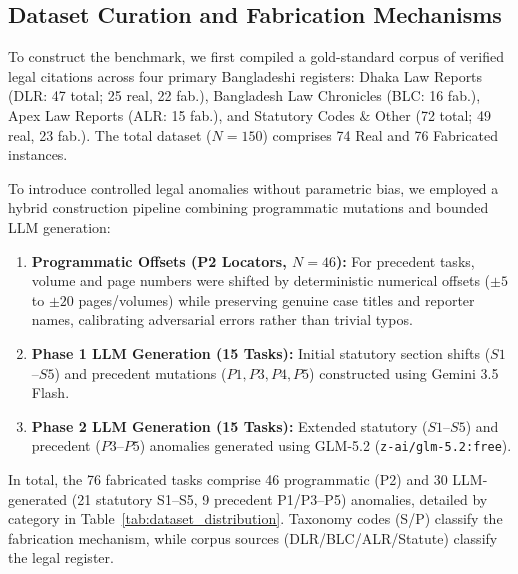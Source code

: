 \documentclass[conference]{IEEEtran}
\begin{document}
\subsection{Dataset Curation and Fabrication Mechanisms}
To construct the benchmark, we first compiled a gold-standard corpus of verified legal citations across four primary Bangladeshi registers: Dhaka Law Reports (DLR: 47 total; 25 real, 22 fab.), Bangladesh Law Chronicles (BLC: 16 fab.), Apex Law Reports (ALR: 15 fab.), and Statutory Codes \& Other (72 total; 49 real, 23 fab.). The total dataset ($N=150$) comprises 74 Real and 76 Fabricated instances.

To introduce controlled legal anomalies without parametric bias, we employed a hybrid construction pipeline combining programmatic mutations and bounded LLM generation:
\begin{enumerate}
\item \textbf{Programmatic Offsets (P2 Locators, $N=46$):} For precedent tasks, volume and page numbers were shifted by deterministic numerical offsets ($\pm 5$ to $\pm 20$ pages/volumes) while preserving genuine case titles and reporter names, calibrating adversarial errors rather than trivial typos.
\item \textbf{Phase 1 LLM Generation (15 Tasks):} Initial statutory section shifts ($S1$--$S5$) and precedent mutations ($P1, P3, P4, P5$) constructed using Gemini 3.5 Flash.
\item \textbf{Phase 2 LLM Generation (15 Tasks):} Extended statutory ($S1$--$S5$) and precedent ($P3$--$P5$) anomalies generated using GLM-5.2 (\texttt{z-ai/glm-5.2:free}).
\end{enumerate}

In total, the 76 fabricated tasks comprise 46 programmatic (P2) and 30 LLM-generated (21 statutory S1--S5, 9 precedent P1/P3--P5) anomalies, detailed by category in Table~\ref{tab:dataset_distribution}. Taxonomy codes (S/P) classify the fabrication mechanism, while corpus sources (DLR/BLC/ALR/Statute) classify the legal register.
\end{document}

